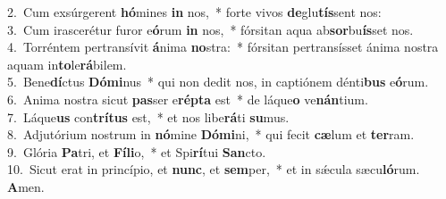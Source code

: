 {2.~}Cum exsúrgerent \textbf{hó}mines \textbf{in} nos,~* forte vivos \textbf{de}glu\textbf{tís}sent nos:\\
{3.~}Cum irascerétur furor e\textbf{ó}rum \textbf{in} nos,~* fórsitan aqua ab\textbf{sor}bu\textbf{ís}set nos.\\
{4.~}Torréntem pertransívit \textbf{á}nima \textbf{no}stra:~* fórsitan pertransísset ánima nostra aquam in\textbf{to}le\textbf{rá}bilem.\\
{5.~}Bene\textbf{dí}ctus \textbf{Dó}\textbf{mi}nus~* qui non dedit nos, in captiónem dénti\textbf{bus} e\textbf{ó}rum.\\
{6.~}Anima nostra sicut \textbf{pas}ser e\textbf{rép}\textbf{ta} est~* de láque\textbf{o} ve\textbf{nán}tium.\\
{7.~}Láque\textbf{us} con\textbf{trí}\textbf{tus} est,~* et nos libe\textbf{rá}ti \textbf{su}mus.\\
{8.~}Adjutórium nostrum in \textbf{nó}mine \textbf{Dó}\textbf{mi}ni,~* qui fecit \textbf{cæ}lum et \textbf{ter}ram.\\
{9.~}Glória \textbf{Pa}tri, et \textbf{Fí}\textbf{li}o,~* et Spi\textbf{rí}tui \textbf{San}cto.\\
{10.~}Sicut erat in princípio, et \textbf{nunc}, et \textbf{sem}per,~* et in sǽcula sæcu\textbf{ló}rum. \textbf{A}men.\\
